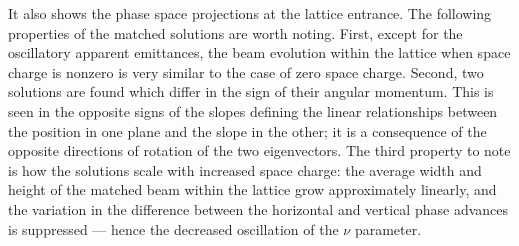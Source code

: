 %
It also shows the phase space projections at the lattice entrance. The following properties of the matched solutions are worth noting. First, except for the oscillatory apparent emittances, the beam evolution within the lattice when space charge is nonzero is very similar to the case of zero space charge. Second, two solutions are found which differ in the sign of their angular momentum. This is seen in the opposite signs of the slopes defining the linear relationships between the position in one plane and the slope in the other; it is a consequence of the opposite directions of rotation of the two eigenvectors. The third property to note is how the solutions scale with increased space charge: the average width and height of the matched beam within the lattice grow approximately linearly, and the variation in the difference between the horizontal and vertical phase advances is suppressed — hence the decreased oscillation of the $\nu$ parameter. 

